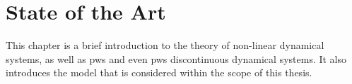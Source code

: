 \chapter{State of the Art}
\label{chap:state}

This chapter is a brief introduction to the theory of non-linear dynamical systems, as well as \gls{pws} and even \gls{pws} discontinuous dynamical systems.
It also introduces the model that is considered within the scope of this thesis.




\clearpage



